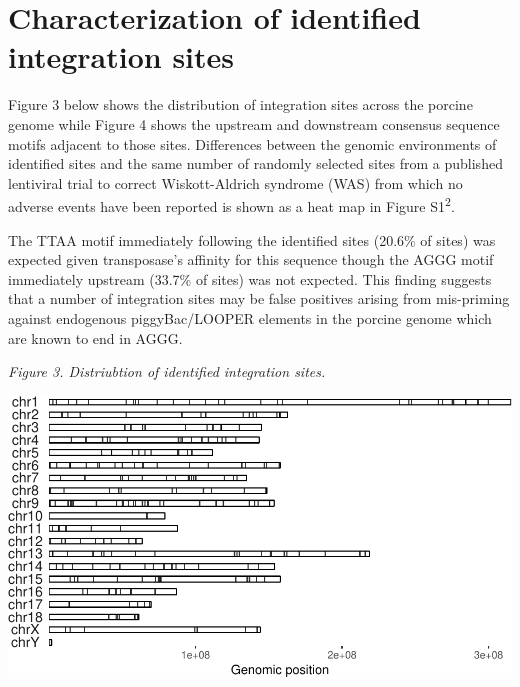 \documentclass[12pt,]{article}
\begin{document}
\section{Characterization of identified integration
sites}\label{characterization-of-identified-integration-sites}

Figure 3 below shows the distribution of integration sites across the
porcine genome while Figure 4 shows the upstream and downstream
consensus sequence motifs adjacent to those sites. Differences between
the genomic environments of identified sites and the same number of
randomly selected sites from a published lentiviral trial to correct
Wiskott-Aldrich syndrome (WAS) from which no adverse events have been
reported is shown as a heat map in Figure S1\textsuperscript{2}.

The TTAA motif immediately following the identified sites (20.6\% of
sites) was expected given transposase's affinity for this sequence
though the AGGG motif immediately upstream (33.7\% of sites) was not
expected. This finding suggests that a number of integration sites may
be false positives arising from mis-priming against endogenous
piggyBac/LOOPER elements in the porcine genome which are known to end in
AGGG.

\vspace{0.25cm}

\emph{Figure 3. Distriubtion of identified integration sites.}

\vspace{0.50cm}

\includegraphics{project_files/figure-latex/intSiteLocPlot-1.pdf}
\vspace{0.50cm}
\end{document}
